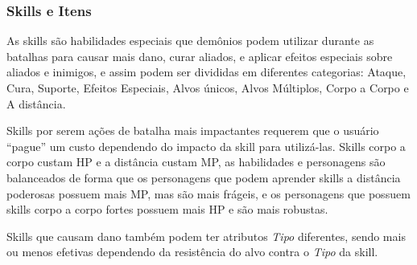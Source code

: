 \documentclass[
	12pt,				%
	openright,			%
	twoside,			%
	a4paper,			%
	english,			%
	french,				%
	spanish,			%
	brazil				%
	]{abntex2}
\begin{document}
\subsubsection{Skills e Itens}

As skills são habilidades especiais que demônios podem utilizar durante as batalhas para causar mais dano, curar aliados, e aplicar efeitos especiais sobre aliados e inimigos, e assim podem ser divididas em diferentes categorias: Ataque, Cura, Suporte, Efeitos Especiais, Alvos únicos, Alvos Múltiplos, Corpo a Corpo e A distância.

Skills por serem ações de batalha mais impactantes requerem que o usuário “pague” um custo dependendo do impacto da skill para utilizá-las. Skills corpo a corpo custam HP e a distância custam MP, as habilidades e personagens são balanceados de forma que os personagens que podem aprender skills a distância poderosas possuem mais MP, mas são mais frágeis, e os personagens que possuem skills corpo a corpo fortes possuem mais HP e são mais robustas.

Skills que causam dano também podem ter atributos \emph{Tipo} diferentes, sendo mais ou menos efetivas dependendo da resistência do alvo contra o \emph{Tipo} da skill.
\end{document}
